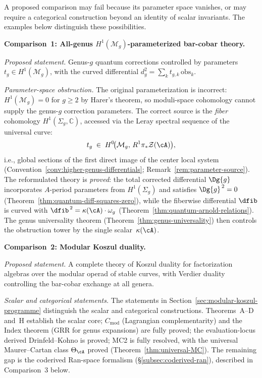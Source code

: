A proposed comparison may fail because its parameter space vanishes, or may
require a categorical construction beyond an identity of scalar invariants.
The examples below distinguish these possibilities.

\medskip

\noindent\textbf{Comparison~1: All-genus $H^1(\mathcal{M}_g)$-parameterized
bar-cobar theory.}

\emph{Proposed statement.}
Genus-$g$ quantum corrections controlled by parameters
$t_g \in H^1(\mathcal{M}_g)$, with the curved differential
$d_g^2 = \sum_k t_{g,k}\,\mathrm{obs}_k$.

\emph{Parameter-space obstruction.}
The original parameterization is incorrect: $H^1(\mathcal{M}_g) = 0$
for $g \geq 2$ by Harer's theorem, so moduli-space cohomology cannot
supply the genus-$g$ correction parameters.  The correct source is
the \emph{fiber} cohomology $H^1(\Sigma_g, \mathbb{C})$, accessed
via the Leray spectral sequence of the universal curve:
\[
t_g \;\in\; H^0\!\bigl(\mathcal{M}_g,\, R^1\pi_*\mathcal{Z}(\cA)\bigr),
\]
i.e., global sections of the first direct image of the center local
system (Convention~\ref{conv:higher-genus-differentials};
Remark~\ref{rem:parameter-source}).  The reformulated theory is
\emph{proved}: the total corrected differential $\Dg{g}$ incorporates
$A$-period parameters from $H^1(\Sigma_g)$ and satisfies
$\Dg{g}^{\,2} = 0$ (Theorem~\ref{thm:quantum-diff-squares-zero}),
while the fiberwise differential $\dfib$ is curved with
$\dfib^{\,2} = \kappa(\cA)\cdot\omega_g$
(Theorem~\ref{thm:quantum-arnold-relations}).  The genus
universality theorem (Theorem~\ref{thm:genus-universality}) then
controls the obstruction tower by the single scalar~$\kappa(\cA)$.

\medskip

\noindent\textbf{Comparison~2: Modular Koszul duality.}

\emph{Proposed statement.}
A complete theory of Koszul duality for factorization algebras
over the modular operad of stable curves, with Verdier duality
controlling the bar-cobar exchange at all genera.

\emph{Scalar and categorical statements.}
The statements in Section~\ref{sec:modular-koszul-programme}
distinguish the scalar and categorical constructions.  Theorems~A--D and~H establish the
scalar core; $C_{\mathrm{mod}}$ (Lagrangian complementarity) and the
Index theorem (GRR for genus expansions) are fully proved; the
evaluation-locus derived Drinfeld--Kohno is proved; MC2 is
fully resolved, with the universal Maurer--Cartan class
$\Theta_{\cA}$ proved (Theorem~\ref{thm:universal-MC}).
The remaining gap is the coderived Ran-space formalism
(\S\ref{subsec:coderived-ran}), described in Comparison~3 below.


